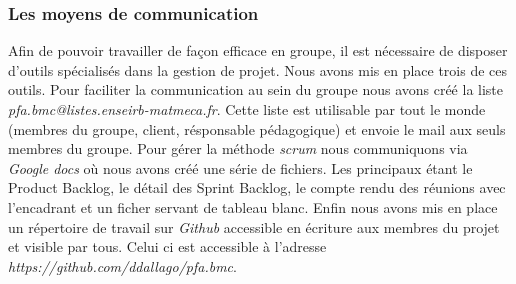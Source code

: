 \subsubsection*{Les moyens de communication}
Afin de pouvoir travailler de façon efficace en groupe, il est nécessaire de disposer d'outils spécialisés dans la gestion de projet.
Nous avons mis en place trois de ces outils.
Pour faciliter la communication au sein du groupe nous avons créé la liste \textit{pfa.bmc@listes.enseirb-matmeca.fr}. Cette liste est utilisable par tout le monde (membres du groupe, client, résponsable pédagogique) et envoie le mail aux seuls membres du groupe.
Pour gérer la méthode \textit{scrum} nous communiquons via \textit{Google docs} où nous avons créé une série de fichiers. Les principaux étant le Product Backlog, le détail des Sprint Backlog, le compte rendu des réunions avec l'encadrant et un ficher servant de tableau blanc.
Enfin nous avons mis en place un répertoire de travail sur \textit{Github} accessible en écriture aux membres du projet et visible par tous. Celui ci est accessible à l'adresse \textit{https://github.com/ddallago/pfa.bmc}.

